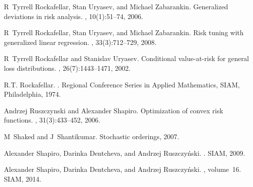 \documentclass[10pt,letterpaper]{article}
\newcommand{\1}{1{\hskip -2.55 pt}\hbox{I}}
\begin{document}
\begin{thebibliography}{10}
R~Tyrrell Rockafellar, Stan Uryasev, and Michael Zabarankin.
\newblock Generalized deviations in risk analysis.
, 10(1):51--74, 2006.

R~Tyrrell Rockafellar, Stan Uryasev, and Michael Zabarankin.
\newblock Risk tuning with generalized linear regression.
, 33(3):712--729, 2008.

R~Tyrrell Rockafellar and Stanislav Uryasev.
\newblock Conditional value-at-risk for general loss distributions.
, 26(7):1443--1471, 2002.

R.T. Rockafellar.
.
\newblock Regional Conference Series in Applied Mathematics, SIAM,
  Philadelphia, 1974.

Andrzej Ruszczynski and Alexander Shapiro.
\newblock Optimization of convex risk functions.
, 31(3):433--452, 2006.

M~Shaked and J~Shantikumar.
\newblock Stochastic orderings, 2007.

Alexander Shapiro, Darinka Dentcheva, and Andrzej Ruszczy{\'n}ski.
.
\newblock SIAM, 2009.

Alexander Shapiro, Darinka Dentcheva, and Andrzej Ruszczy{\'n}ski.
,
  volume~16.
\newblock SIAM, 2014.

\end{thebibliography}
\end{document}
